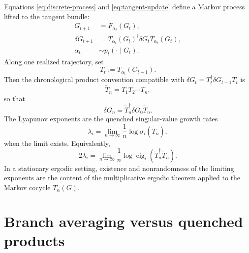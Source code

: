 \documentclass[aps,preprint,onecolumn,nofootinbib,superscriptaddress]{revtex4-2}
\theoremstyle{definition}
\theoremstyle{plain}
\begin{document}
Equations \eqref{eq:discrete-process} and \eqref{eq:tangent-update} define a
Markov process lifted to the tangent bundle:
\begin{align}
  G_{t+1}
  &=
  F_{\alpha_t}(G_t),
  \\
  \delta G_{t+1}
  &=
  T_{\alpha_t}(G_t)^\dagger
  \delta G_t
  T_{\alpha_t}(G_t),
  \\
  \alpha_t
  &\sim
  p_t(\cdot\mid G_t).
\end{align}
Along one realized trajectory, set
\begin{equation}
  T_t:=T_{\alpha_t}(G_{t-1}).
\end{equation}
Then the chronological product convention compatible with
\(\delta G_t=T_t^\dagger\delta G_{t-1}T_t\) is
\begin{equation}
  \widetilde T_n
  =
  T_1T_2\cdots T_n,
  \label{eq:chronological-product}
\end{equation}
so that
\begin{equation}
  \delta G_n
  =
  \widetilde T_n^\dagger
  \delta G_0
  \widetilde T_n.
  \label{eq:delta-product}
\end{equation}
The Lyapunov exponents are the quenched singular-value growth rates
\begin{equation}
  \lambda_i
  =
  \lim_{n\to\infty}
  \frac{1}{n}\log \sigma_i(\widetilde T_n),
  \label{eq:lyapunov-svd}
\end{equation}
when the limit exists. Equivalently,
\begin{equation}
  2\lambda_i
  =
  \lim_{n\to\infty}
  \frac{1}{n}
  \log \operatorname{eig}_i
  \left(\widetilde T_n^\dagger\widetilde T_n\right).
  \label{eq:lyapunov-positive}
\end{equation}
In a stationary ergodic setting, existence and nonrandomness of the limiting
exponents are the content of the multiplicative ergodic theorem applied to the
Markov cocycle \(T_\alpha(G)\).

\section{Branch averaging versus quenched products}
\end{document}
